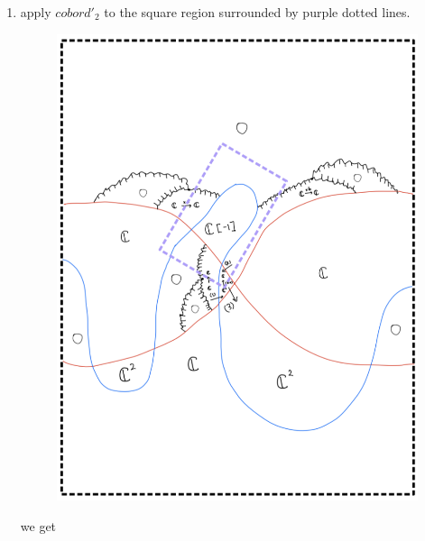 \begin{enumerate}[label=(Step \arabic*)]
\item apply $cobord'_2$ to the square region surrounded by purple dotted lines.

\begin{figure}[H]
    \centering
    \includegraphics[scale = 0.95]{diagrams/cobord8/6.png}
    \caption{}
    \label{fig:your-label}
\end{figure}
we get
\begin{figure}[H]
    \centering

\end{figure}
\end{enumerate}
